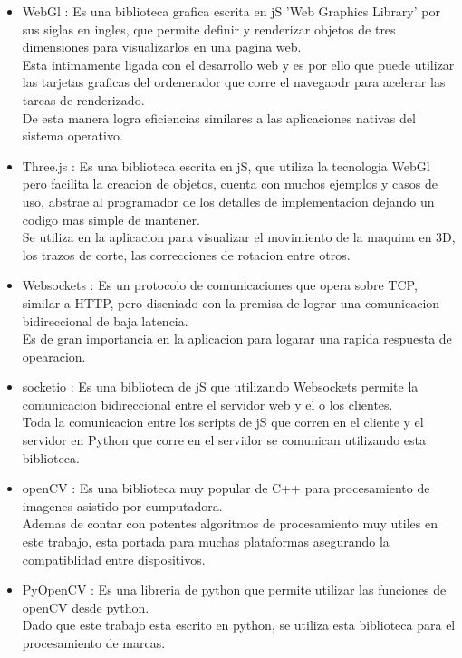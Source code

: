 \begin{itemize}
{         Tambien se estan utilizando bibliotecas para diferentes usos escritas en este lenguaje, lo que permite reutilizar codigo y herramientas de terceros. \\
      }
      \item{WebGl \citep{WEBSITE:webgl}: Es una biblioteca grafica escrita en jS 'Web Graphics Library' por sus siglas en ingles, que permite definir y renderizar objetos de tres dimensiones para visualizarlos en una pagina web.\\
         Esta intimamente ligada con el desarrollo web y es por ello que puede utilizar las tarjetas graficas del ordenerador que corre el navegaodr para acelerar las tareas de renderizado.\\
         De esta manera logra eficiencias similares a las aplicaciones nativas del sistema operativo.
      }
      \item{Three.js \citep{WEBSITE:threejs}: Es una biblioteca escrita en jS, que utiliza la tecnologia WebGl pero facilita la creacion de objetos, cuenta con muchos ejemplos y casos de uso, abstrae al programador de los detalles de implementacion dejando un codigo mas simple de mantener.\\
         Se utiliza en la aplicacion para visualizar el movimiento de la maquina en 3D, los trazos de corte, las correcciones de rotacion entre otros. \\
      }
      \item{Websockets \citep{WEBSITE:websockets}: Es un protocolo de comunicaciones que opera sobre TCP, similar a HTTP, pero diseniado con la premisa de lograr una comunicacion bidireccional de baja latencia.\\
         Es de gran importancia en la aplicacion para logarar una rapida respuesta de opearacion.
      }
      \item{socketio \citep{WEBSITE:socketio}: Es una biblioteca de jS que utilizando Websockets permite la comunicacion bidireccional entre el servidor web y el o los clientes. \\
         Toda la comunicacion entre los scripts de jS que corren en el cliente y el servidor en Python que corre en el servidor se comunican utilizando esta biblioteca.
      }
   \item{openCV \citep{WEBSITE:opencv}: Es una biblioteca muy popular de C++ para procesamiento de imagenes asistido por cumputadora.\\
         Ademas de contar con potentes algoritmos de procesamiento muy utiles en este trabajo, esta portada para muchas plataformas asegurando la compatiblidad entre dispositivos.
      }
   \item{PyOpenCV \citep{WEBSITE:pyopencv}: Es una libreria de python que permite utilizar las funciones de openCV desde python.\\
         Dado que este trabajo esta escrito en python, se utiliza esta biblioteca para el procesamiento de marcas.
      }
\end{itemize}

